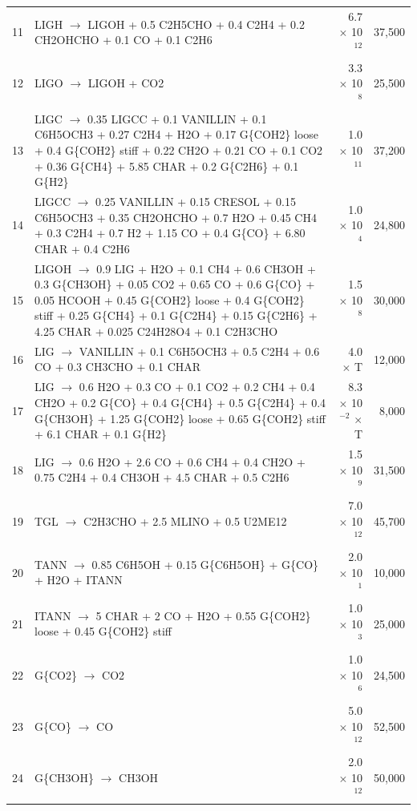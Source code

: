 \begin{center}
\begin{longtable}{cp{4in}rr}
    11 & LIGH $\rightarrow$ LIGOH + 0.5 C2H5CHO + 0.4 C2H4 + 0.2 CH2OHCHO + 0.1 CO + 0.1 C2H6 & 6.7 $\times$ 10$^{12}$ & 37,500 \\
    12 & LIGO $\rightarrow$ LIGOH + CO2 & 3.3 $\times$ 10$^8$ & 25,500 \\
    13 & LIGC $\rightarrow$ 0.35 LIGCC + 0.1 VANILLIN + 0.1 C6H5OCH3 + 0.27 C2H4 + H2O + 0.17 G\{COH2\} loose + 0.4 G\{COH2\} stiff + 0.22 CH2O + 0.21 CO + 0.1 CO2 + 0.36 G\{CH4\} + 5.85 CHAR + 0.2 G\{C2H6\} + 0.1 G\{H2\} & 1.0 $\times$ 10$^{11}$ & 37,200 \\
    14 & LIGCC $\rightarrow$ 0.25 VANILLIN + 0.15 CRESOL + 0.15 C6H5OCH3 + 0.35 CH2OHCHO + 0.7 H2O + 0.45 CH4 + 0.3 C2H4 + 0.7 H2 + 1.15 CO + 0.4 G\{CO\} + 6.80 CHAR + 0.4 C2H6 & 1.0 $\times$ 10$^4$ & 24,800 \\
    15 & LIGOH $\rightarrow$ 0.9 LIG + H2O + 0.1 CH4 + 0.6 CH3OH + 0.3 G\{CH3OH\} + 0.05 CO2 + 0.65 CO + 0.6 G\{CO\} + 0.05 HCOOH + 0.45 G\{COH2\} loose + 0.4 G\{COH2\} stiff + 0.25 G\{CH4\} + 0.1 G\{C2H4\} + 0.15 G\{C2H6\} + 4.25 CHAR + 0.025 C24H28O4 + 0.1 C2H3CHO & 1.5 $\times$ 10$^8$ & 30,000 \\
    16 & LIG $\rightarrow$ VANILLIN + 0.1 C6H5OCH3 + 0.5 C2H4 + 0.6 CO + 0.3 CH3CHO + 0.1 CHAR & 4.0 $\times$ T & 12,000 \\
    17 & LIG $\rightarrow$ 0.6 H2O + 0.3 CO + 0.1 CO2 + 0.2 CH4 + 0.4 CH2O + 0.2 G\{CO\} + 0.4 G\{CH4\} + 0.5 G\{C2H4\} + 0.4 G\{CH3OH\} + 1.25 G\{COH2\} loose + 0.65 G\{COH2\} stiff + 6.1 CHAR + 0.1 G\{H2\} & 8.3 $\times$ 10$^{-2}$ $\times$ T & 8,000 \\
    18 & LIG $\rightarrow$ 0.6 H2O + 2.6 CO + 0.6 CH4 + 0.4 CH2O + 0.75 C2H4 + 0.4 CH3OH + 4.5 CHAR + 0.5 C2H6 & 1.5 $\times$ 10$^9$ & 31,500 \\
    19 & TGL $\rightarrow$ C2H3CHO + 2.5 MLINO + 0.5 U2ME12 & 7.0 $\times$ 10$^{12}$ & 45,700 \\
    20 & TANN $\rightarrow$ 0.85 C6H5OH + 0.15 G\{C6H5OH\} + G\{CO\} + H2O + ITANN & 2.0 $\times$ 10$^1$ & 10,000 \\
    21 & ITANN $\rightarrow$ 5 CHAR + 2 CO + H2O + 0.55 G\{COH2\} loose + 0.45 G\{COH2\} stiff & 1.0 $\times$ 10$^3$ & 25,000 \\
    22 & G\{CO2\} $\rightarrow$ CO2 & 1.0 $\times$ 10$^6$ & 24,500 \\
    23 & G\{CO\} $\rightarrow$ CO & 5.0 $\times$ 10$^{12}$ & 52,500 \\
    24 & G\{CH3OH\} $\rightarrow$ CH3OH & 2.0 $\times$ 10$^{12}$ & 50,000 \\

\end{longtable}
\end{center}

